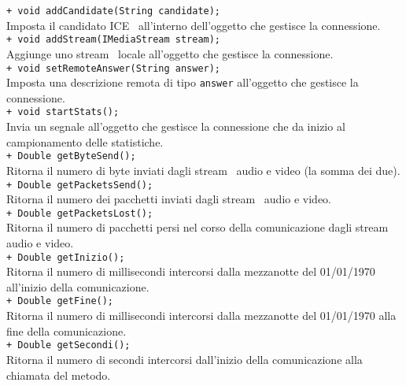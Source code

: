 {{\begin{sloppypar}
{{{\begin{itemize}
					\texttt{+ void addCandidate(String candidate);}\\
					Imposta il candidato ICE\g~ all'interno dell'oggetto che gestisce la connessione.\\
					
					\texttt{+ void addStream(IMediaStream stream);}\\
					Aggiunge uno stream\g~ locale all'oggetto che gestisce la connessione.\\
					
					\texttt{+ void setRemoteAnswer(String answer);}\\
					Imposta una descrizione remota di tipo \texttt{answer} all'oggetto che gestisce la connessione.\\
					
					\texttt{+ void startStats();}\\
					Invia un segnale all'oggetto che gestisce la connessione che da inizio al campionamento delle statistiche.\\
					
					\texttt{+ Double getByteSend();}\\
					Ritorna il numero di byte inviati dagli stream\g~ audio e video (la somma dei due).\\

					\texttt{+ Double getPacketsSend();}\\
					Ritorna il numero dei pacchetti inviati dagli stream\g~ audio e video.\\

					\texttt{+ Double getPacketsLost();}\\
					Ritorna il numero di pacchetti persi nel corso della comunicazione dagli stream\g~ audio e video.\\

					\texttt{+ Double getInizio();}\\
					Ritorna il numero di millisecondi intercorsi dalla mezzanotte del 01/01/1970 all'inizio della comunicazione.\\

					\texttt{+ Double getFine();}\\
					Ritorna il numero di millisecondi intercorsi dalla mezzanotte del 01/01/1970 alla fine della comunicazione.\\
					
					\texttt{+ Double getSecondi();}\\
					Ritorna il numero di secondi intercorsi dall'inizio della comunicazione alla chiamata del metodo.\\
					

\end{itemize}}}}
\end{sloppypar}}}
